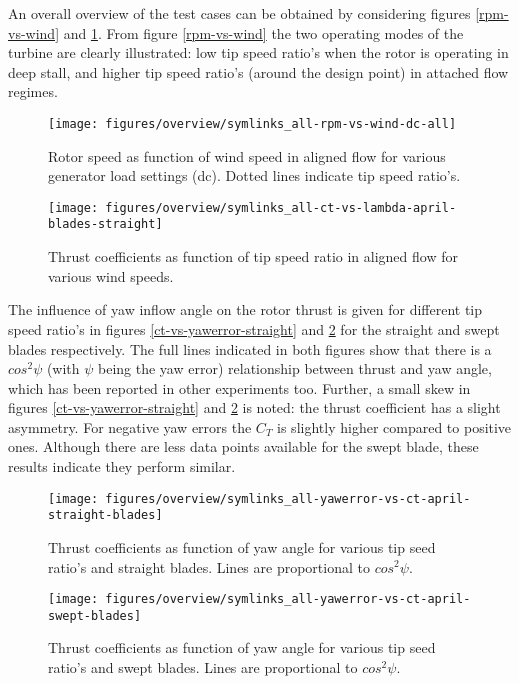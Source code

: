\documentclass[a4paper]{jpconf}
\begin{document}
An overall overview of the test cases can be obtained by considering figures \ref{rpm-vs-wind} and \ref{ct-vs-lambda}. From figure \ref{rpm-vs-wind} the two operating modes of the turbine are clearly illustrated: low tip speed ratio's when the rotor is operating in deep stall, and higher tip speed ratio's (around the design point) in attached flow regimes. 

\begin{figure}[h]
\begin{minipage}{17pc}
\vspace{10px}
\texttt{[image: figures/overview/symlinks\_all-rpm-vs-wind-dc-all]}
\caption{\label{rpm-vs-wind} Rotor speed as function of wind speed in aligned flow for various generator load settings (dc). Dotted lines indicate tip speed ratio's.}
\end{minipage}\hspace{2pc}%
\begin{minipage}{17pc}
\texttt{[image: figures/overview/symlinks\_all-ct-vs-lambda-april-blades-straight]}
\caption{\label{ct-vs-lambda} Thrust coefficients as function of tip speed ratio in aligned flow for various wind speeds.}
\end{minipage} 
\end{figure}


The influence of yaw inflow angle on the rotor thrust is given for different tip speed ratio's in figures \ref{ct-vs-yawerror-straight} and \ref{ct-vs-yawerror-swept} for the straight and swept blades respectively. The full lines indicated in both figures show that there is a $cos^2 \psi$ (with $\psi$ being the yaw error) relationship between thrust and yaw angle, which has been reported in other experiments too. Further, a small skew in figures \ref{ct-vs-yawerror-straight} and \ref{ct-vs-yawerror-swept} is noted: the thrust coefficient has a slight asymmetry. For negative yaw errors the $C_T$ is slightly higher compared to positive ones. Although there are less data points available for the swept blade, these results indicate they perform similar.


\begin{figure}[h]
\begin{minipage}{17pc}
\texttt{[image: figures/overview/symlinks\_all-yawerror-vs-ct-april-straight-blades]}
\caption{\label{ct-vs-yawerror-straight} Thrust coefficients as function of yaw angle for various tip seed ratio's and straight blades. Lines are proportional to $cos^2 \psi$.}
\end{minipage}\hspace{2pc}%
\begin{minipage}{17pc}
\texttt{[image: figures/overview/symlinks\_all-yawerror-vs-ct-april-swept-blades]}
\caption{\label{ct-vs-yawerror-swept} Thrust coefficients as function of yaw angle for various tip seed ratio's and swept blades. Lines are proportional to $cos^2 \psi$.}
\end{minipage} 
\end{figure}
\end{document}
